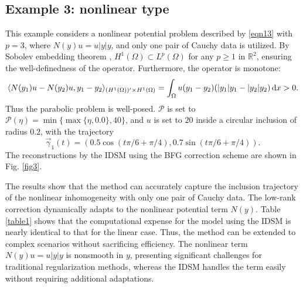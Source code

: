 \documentclass[onefignum,onetabnum]{siamart190516}
\newcommand\rmd {\,{\rm d}}
\numberwithin{equation}{section}
\begin{document}
\subsection{Example 3: nonlinear type}\label{exam:3}
This example considers a nonlinear potential problem described by \eqref{eqn13} with $p=3$, where $N(y)u=u|y|y$, and only one pair of Cauchy data is utilized.
By Sobolev embedding theorem \cite{Evans2010}, $H^{1}(\Omega)\subset L^{p}(\Omega)$ for any $p\geq 1$ in $\mathbb{R}^{2}$, ensuring the well-definedness of the operator.
Furthermore, the operator is monotone:
\begin{equation*}
\langle N(y_{1})u-N(y_{2})u, y_{1}-y_{2}\rangle_{(H^{1}(\Omega))'\times H^{1}(\Omega)}=\int_{\Omega}u(y_{1}-y_{2})(|y_{1}|y_{1}-|y_{2}|y_{2})\rmd x>0.
\end{equation*}
Thus the parabolic problem is well-posed.
$\mathcal{P}$ is set to $\mathcal{P}(\eta)=\min\{\max\{\eta, 0.0\}, 40\}$, and $u$ is set to $20$ inside a circular inclusion of radius $0.2$, with the trajectory
\begin{equation*}
\vec{\gamma}_{1}(t)=(0.5\cos(t\pi/ 6+\pi/4),0.7\sin(t\pi/ 6+\pi/4)).
\end{equation*}
The reconstructions by the IDSM using the BFG correction scheme are shown in Fig. \ref{fig3}.

The results show that the method can accurately capture the inclusion trajectory of the nonlinear inhomogeneity with only one pair of Cauchy data.
The low-rank correction dynamically adapts to the nonlinear potential term $N(y)$.
Table \ref{table1} shows that the computational expense for the model using the IDSM is nearly identical to that for the linear case.
Thus, the method can be extended to complex scenarios without sacrificing efficiency.
The nonlinear term $N(y)u=u|y|y$ is nonsmooth in $y$, presenting significant challenges for traditional regularization methods, whereas the IDSM handles the term easily without requiring additional adaptations.
\end{document}
